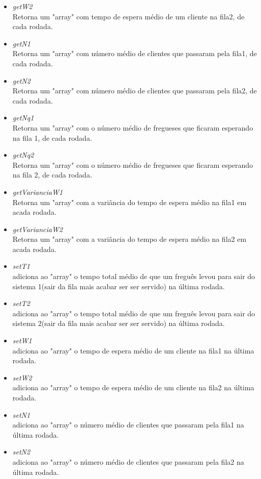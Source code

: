 \documentclass[a4paper,10pt]{article}
\begin{document}
\begin{itemize}
\begin{itemize}
\begin{itemize}
			 \item  \textit{getW2\\}Retorna um "array" com tempo de espera médio de um cliente na fila2, de cada rodada.
			 \item  \textit{getN1\\}Retorna um "array" com número médio de clientes que passaram pela fila1, de cada rodada. 
			 \item  \textit{getN2\\}Retorna um "array" com número médio de clientes que passaram pela fila2, de cada rodada.
			 \item  \textit{getNq1\\}Retorna um "array" com o número médio de fregueses que ficaram esperando na fila 1, de cada rodada.
			 \item  \textit{getNq2\\}Retorna um "array" com o número médio de fregueses que ficaram esperando na fila 2, de cada rodada.
			 \item  \textit{getVarianciaW1\\}Retorna um "array" com a variância do tempo de espera médio na fila1  em acada rodada.
			 \item  \textit{getVarianciaW2\\}Retorna um "array" com a variância do tempo de espera médio na fila2  em acada rodada.
			 \item  \textit{setT1\\}adiciona ao "array" o tempo total médio de que um freguês levou para sair do sistema 1(sair da fila mais acabar ser ser servido) na última rodada.
			 \item  \textit{setT2\\}adiciona ao "array" o tempo total médio de que um freguês levou para sair do sistema 2(sair da fila mais acabar ser ser servido) na última rodada.
			 \item  \textit{setW1\\}adiciona ao "array" o tempo de espera médio de um cliente na fila1 na última rodada.
			 \item  \textit{setW2\\}adiciona ao "array" o tempo de espera médio de um cliente na fila2 na última rodada.
			 \item  \textit{setN1\\}adiciona ao "array" o número médio de clientes que passaram pela fila1 na última rodada.
			 \item  \textit{setN2\\}adiciona ao "array" o número médio de clientes que passaram pela fila2 na última rodada.

\end{itemize}
\end{itemize}
\end{itemize}
\end{document}
